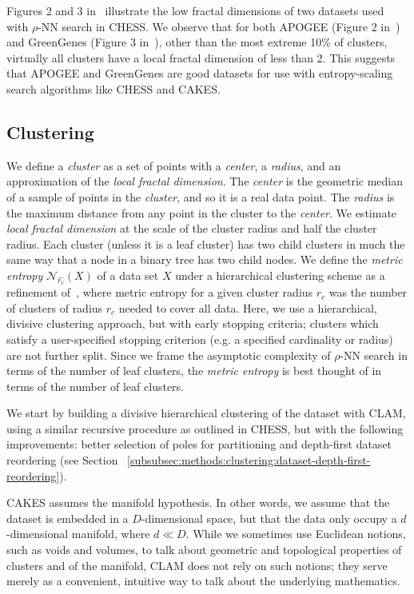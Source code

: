 Figures 2 and 3 in~\cite{ishaq2019clustered} illustrate the low fractal dimensions of two datasets used with $\rho$-NN search in CHESS. 
We observe that for both APOGEE (Figure 2 in~\cite{ishaq2019clustered}) and GreenGenes (Figure 3 in~\cite{ishaq2019clustered}), other than the most extreme 10\% of clusters, virtually all clusters have a local fractal dimension of less than 2. 
This suggests that APOGEE and GreenGenes are good datasets for use with entropy-scaling search algorithms like CHESS and CAKES.


\subsection{Clustering}
\label{subsec:methods:clustering}

We define a \emph{cluster} as a set of points with a \emph{center}, a \emph{radius}, and an approximation of the \emph{local fractal dimension}.
The \emph{center} is the geometric median of a sample of points in the \emph{cluster}, and so it is a real data point.
The \emph{radius} is the maximum distance from any point in the cluster to the \emph{center}.
We estimate \emph{local fractal dimension} at the scale of the cluster radius and half the cluster radius.
Each cluster (unless it is a leaf cluster) has two child clusters in much the same way that a node in a binary tree has two child nodes.
We define the \emph{metric entropy} $\mathcal{N}_{\hat{r_c}}(X)$ of a data set $X$ under a hierarchical clustering scheme as a refinement of~\cite{yu2015entropy}, where metric entropy for a given cluster radius $r_c$ was the number of clusters of radius $r_c$ needed to cover all data.
Here, we use a hierarchical, divisive clustering approach, but with early stopping criteria; clusters which satisfy a user-specified stopping criterion (e.g. a specified cardinality or radius) are not further split.
Since we frame the asymptotic complexity of $\rho$-NN search in terms of the number of leaf clusters, the \emph{metric entropy} is best thought of in terms of the number of leaf clusters.

We start by building a divisive hierarchical clustering of the dataset with CLAM, using a similar recursive procedure as outlined in CHESS, but with the following improvements:
better selection of poles for partitioning and depth-first dataset reordering (see Section ~\ref{subsubsec:methods:clustering:dataset-depth-first-reordering}). 

CAKES assumes the manifold hypothesis. 
In other words, we assume that the dataset is embedded in a $D$-dimensional space, but that the data only occupy a $d$-dimensional manifold, where $d \ll D$. 
While we sometimes use Euclidean notions, such as voids and volumes, to talk about geometric and topological properties of clusters and of the manifold, CLAM does not rely on such notions; 
they serve merely as a convenient, intuitive way to talk about the underlying mathematics.


